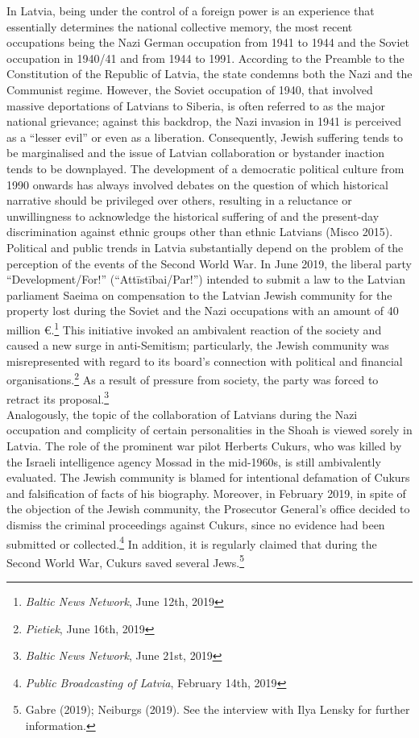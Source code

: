 In Latvia, being under the control of a foreign power is an experience that essentially determines the national collective memory, the most recent occupations being the Nazi German occupation from 1941 to 1944 and the Soviet occupation in 1940/41 and from 1944 to 1991. According to the Preamble to the Constitution of the Republic of Latvia, the state condemns both the Nazi and the Communist regime. However, the Soviet occupation of 1940, that involved massive deportations of Latvians to Siberia, is often referred to as the major national grievance; against this backdrop, the Nazi invasion in 1941 is perceived as a ``lesser evil'' or even as a liberation. Consequently, Jewish suffering tends to be marginalised and the issue of Latvian collaboration or bystander inaction tends to be downplayed. The development of a democratic political culture from 1990 onwards has always involved debates on the question of which historical narrative should be privileged over others, resulting in a reluctance or unwillingness to acknowledge the historical suffering of and the present-day discrimination against ethnic groups other than ethnic Latvians (Misco 2015). \\
Political and public trends in Latvia substantially depend on the problem of the perception of the events of the Second World War. In June 2019, the liberal party ``Development/For!'' (``Attīstībai/Par!'') intended to submit a law to the Latvian parliament Saeima on compensation to the Latvian Jewish community for the property lost during the Soviet and the Nazi occupations with an amount of 40 million \euro{}.\footnote{\textit{Baltic News Network}, June 12th, 2019} This initiative invoked an ambivalent reaction of the society and caused a new surge in anti-Semitism; particularly, the Jewish community was misrepresented with regard to its board's connection with political and financial organisations.\footnote{\textit{Pietiek}, June 16th, 2019} As a result of pressure from society, the party was forced to retract its proposal.\footnote{\textit{Baltic News Network}, June 21st, 2019}\\  
Analogously, the topic of the collaboration of Latvians during the Nazi occupation and complicity of certain personalities in the Shoah is viewed sorely in Latvia. The role of the prominent war pilot Herberts Cukurs, who was killed by the Israeli intelligence agency Mossad in the mid-1960s, is still ambivalently evaluated. The Jewish community is blamed for intentional defamation of Cukurs and falsification of facts of his biography. Moreover, in February 2019, in spite of the objection of the Jewish community, the Prosecutor General's office decided to dismiss the criminal proceedings against Cukurs, since no evidence had been submitted or collected.\footnote{\textit{Public Broadcasting of Latvia}, February 14th, 2019} In addition, it is regularly claimed that during the Second World War, Cukurs saved several Jews.\footnote{Gabre (2019); Neiburgs (2019). See the interview with Ilya Lensky for further information.}\\
